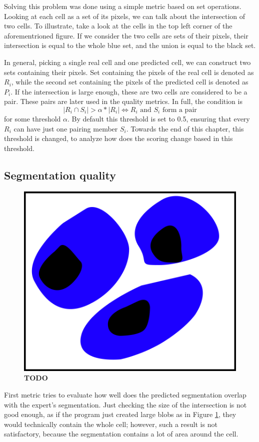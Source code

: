 \documentclass[
  digital,     %
  oneside,     %
  nosansbold,  %
  nocolorbold, %
  lof,         %
  lot,         %
]{fithesis4}
\begin{document}
Solving this problem was done using a simple metric based on set operations.
Looking at each cell as a set of its pixels, we can talk about the intersection
of two cells. To illustrate, take a look at the cells in the top left corner of
the aforementrioned figure. If we consider the two cells are sets of their
pixels, their intersection is equal to the whole blue set, and the union is
equal to the black set.

In general, picking a single real cell and one predicted cell, we can construct
two sets containing their pixels. Set containing the pixels of the real cell is
denoted as $R_i$, while the second set containing the pixels of the predicted
cell is denoted as $P_i$. If the intersection is large enough, these are two
cells are considered to be a pair. These pairs are later used in the quality
metrics. In full, the condition is
$$|R_i \cap S_i| > \alpha * |R_i| \Leftrightarrow R_i \text{ and } S_i \text{ form a pair}$$
for some threshold $\alpha$. By default this threshold is set to 0.5, ensuring
that every $R_i$ can have just one pairing member $S_i$. Towards the end of this
chapter, this threshold is changed, to analyze how does the scoring change based
in this threshold.


\subsection{Segmentation quality}
\begin{figure}
    \begin{center}
        \includegraphics{resources/inkscape/evaluation_imprecise_segmentation.png}
    \end{center}
    \caption{\textbf{TODO}}
    \label{fig:evaluation_imprecise}
\end{figure}
First metric tries to evaluate how well does the predicted segmentation overlap
with the expert's segmentation. Just checking the size of the intersection is
not good enough, as if the program just created large blobs as in Figure
\ref{fig:evaluation_imprecise}, they would technically contain the whole cell;
however, such a result is not satisfactory, because the segmentation contains a
lot of area around the cell.
\end{document}
